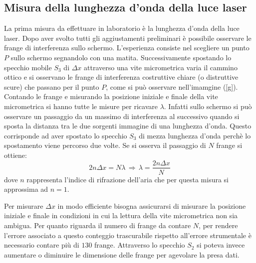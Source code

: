 \documentclass[11pt]{article}
\begin{document}
\subsection{Misura della lunghezza d'onda della luce laser}
La prima misura da effettuare in laboratorio è la lunghezza d'onda della luce laser. Dopo aver svolto tutti gli aggiustamenti preliminari è possibile osservare le frange di interferenza sullo schermo. L'esperienza consiste nel scegliere un punto $P$ sullo schermo segnandolo con una matita. Successivamente spostando lo specchio mobile $S_3$ di $\Delta x$ attraverso una vite micrometrica varia il cammino ottico e si osservano le frange di interferenza costruttive chiare (o distruttive scure) che passano per il punto $P$, come si può osservare nell'imamgine (\ref{g}). Contando le frange e misurando la posizione iniziale e finale della vite micrometrica si hanno tutte le misure per ricavare $\lambda$.
Infatti sullo schermo si può osservare un passaggio da un massimo di interferenza al successivo quando si sposta la distanza tra le due sorgenti immagine di una lunghezza d'onda. Questo corrisponde ad aver spostato lo specchio $S_3$ di mezza lunghezza d'onda perchè lo spostamento viene percorso due volte. Se si osserva il passaggio di $N$ frange si ottiene:
\begin{equation}
    2n\Delta x = N \lambda\, \Longrightarrow \,\lambda = \frac{2 n \Delta x}{N}
    \label{formula}
\end{equation}
dove $n$ rappresenta l'indice di rifrazione dell'aria che per questa misura si approssima ad $n = 1$.

Per misurare $\Delta x$ in modo efficiente bisogna assicurarsi di misurare la posizione iniziale e finale in condizioni in cui la lettura della vite micrometrica non sia ambigua. Per quanto riguarda il numero di frange da contare $N$, per rendere l'errore associato a questo conteggio trascurabile rispetto all'errore strumentale è necessario contare più di $130$ frange. Attraverso lo specchio $S_2$ si poteva invece aumentare o diminuire le dimensione delle frange per agevolare la presa dati.
\end{document}
